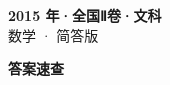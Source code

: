 \documentclass[zihao=-4, a4paper]{ctexart}
\begin{document}
\begin{center}
  {\Large\bfseries 2015 年·全国Ⅱ卷·文科}\\[4pt]
  {\large 数学 · 简答版}
\end{center}
\medskip
{}

\clearpage
{}
\begin{center}{\Large\bfseries 答案速查}\end{center}
\medskip

\end{document}
